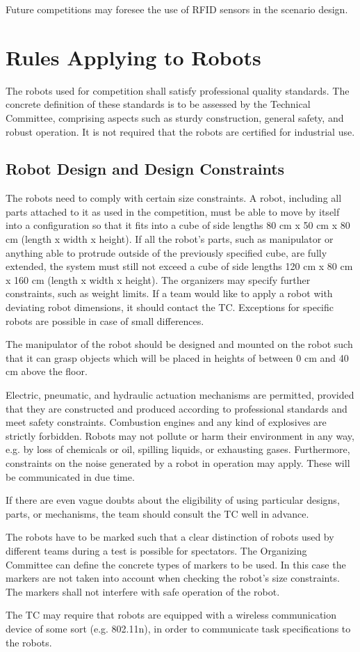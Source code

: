 Future competitions may foresee the use of RFID sensors in the scenario design.


\section{Rules Applying to Robots}
The robots used for competition shall satisfy professional quality standards. The concrete definition of these standards is to be assessed by the Technical Committee, comprising aspects such as sturdy construction, general safety, and robust operation. It is not required that the robots are certified for industrial use.

\subsection{Robot Design and Design Constraints}
The robots need to comply with certain size constraints. A robot, including all parts attached to it as used in the competition, must be able to move by itself into a configuration so that it fits into a cube of side lengths 80 cm x 50 cm x 80 cm (length x width x height). If all the robot’s parts, such as manipulator or anything able to protrude outside of the previously specified cube, are fully extended, the system must still not exceed a cube of side lengths 120 cm x 80 cm x 160 cm (length x width x height). The organizers may specify further constraints, such as weight limits. If a team would like to apply a robot with deviating robot dimensions, it should contact the TC. Exceptions for specific robots are possible in case of small differences.

\par
The manipulator of the robot should be designed and mounted on the robot such that it can grasp objects which will be placed in heights of between 0 cm and 40 cm above the floor.
\par
Electric, pneumatic, and hydraulic actuation mechanisms are permitted, provided that they are constructed and produced according to professional standards and meet safety constraints. Combustion engines and any kind of explosives are strictly forbidden. Robots may not pollute or harm their environment in any way, e.g. by loss of chemicals or oil, spilling liquids, or exhausting gases. Furthermore, constraints on the noise generated by a robot in operation may apply. These will be communicated in due time.
\par
If there are even vague doubts about the eligibility of using particular designs, parts, or mechanisms, the team should consult the TC well in advance.
\par
The robots have to be marked such that a clear distinction of robots used by different teams during a test is possible for spectators. The Organizing Committee can define the concrete types of markers to be used. In this case the markers are not taken into account when checking the robot’s size constraints. The markers shall not interfere with safe operation of the robot.
\par
The TC may require that robots are equipped with a wireless communication device of some sort (e.g. 802.11n), in order to communicate task specifications to the robots.

